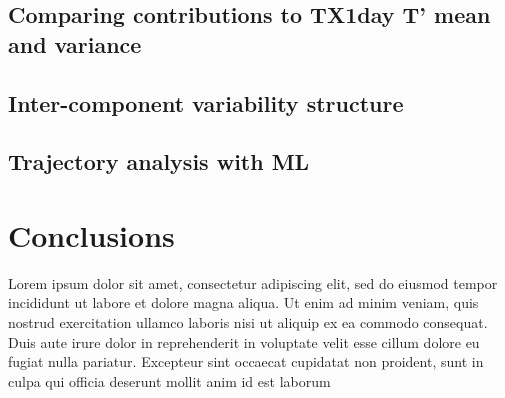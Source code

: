 \documentclass[11pt,a4paper,twoside,openright]{report}
\theoremstyle{definition}
\numberwithin{equation}{subsection}
\begin{document}
\hypertarget{comparing-contributions-to-tx1day-t-mean-and-variance}{%
\section{Comparing contributions to TX1day T' mean and variance}\label{comparing-contributions-to-tx1day-t-mean-and-variance}}

\hypertarget{inter-component-variability-structure}{%
\section{Inter-component variability structure}\label{inter-component-variability-structure}}

\hypertarget{trajectory-analysis-with-ml}{%
\section{Trajectory analysis with ML}\label{trajectory-analysis-with-ml}}

\hypertarget{conclusions}{%
\chapter{Conclusions}\label{conclusions}}

Lorem ipsum dolor sit amet, consectetur adipiscing elit, sed do eiusmod tempor
incididunt ut labore et dolore magna aliqua. Ut enim ad minim veniam, quis
nostrud exercitation ullamco laboris nisi ut aliquip ex ea commodo consequat.
Duis aute irure dolor in reprehenderit in voluptate velit esse cillum dolore
eu fugiat nulla pariatur. Excepteur sint occaecat cupidatat non proident, sunt
in culpa qui officia deserunt mollit anim id est laborum
\cleardoublepage
{}




\appendix


\end{document}
